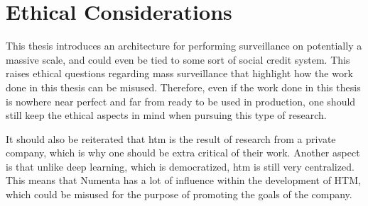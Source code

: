 \section{Ethical Considerations}
This thesis introduces an architecture for performing surveillance on potentially a massive scale, and could even be tied to some sort of social credit system. This raises ethical questions regarding mass surveillance that highlight how the work done in this thesis can be misused. Therefore, even if the work done in this thesis is nowhere near perfect and far from ready to be used in production, one should still keep the ethical aspects in mind when pursuing this type of research.
\par
It should also be reiterated that \gls*{htm} is the result of research from a private company, which is why one should be extra critical of their work. Another aspect is that unlike deep learning, which is democratized, \gls*{htm} is still very centralized. This means that Numenta has a lot of influence within the development of HTM, which could be misused for the purpose of promoting the goals of the company.
